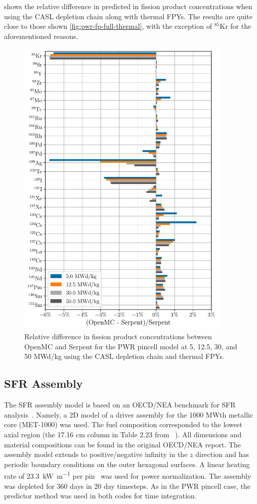 \documentclass[3p,authoryear]{elsarticle}
\begin{document}
 shows the relative difference in predicted in
fission product concentrations when using the CASL depletion chain along with
thermal FPYs. The results are quite close to those shown
\cref{fig:pwr-fp-full-thermal}, with the exception of $^{85}$Kr for the
aforementioned reasons.
\begin{figure}[H]
  \centering
  \includegraphics[width=4in]{figures/pwr_fp_casl_thermal.pdf}
  \caption{Relative difference in fission product concentrations between OpenMC
  and Serpent for the PWR pincell model at 5, 12.5, 30, and 50 MWd/kg using the
  CASL depletion chain and thermal FPYs.}
  \label{fig:pwr-fp-casl-thermal}
\end{figure}

\subsection{SFR Assembly}

The SFR assembly model is based on an OECD/NEA benchmark for SFR
analysis~\citep{nsc2015}. Namely, a 2D model of a driver assembly for the 1000
MWth metallic core (MET-1000) was used. The fuel composition corresponded to the
lowest axial region (the 17.16 cm column in Table 2.23 from ~\citep{nsc2015}).
All dimensions and material compositions can be found in the original OECD/NEA
report. The assembly model extends to positive/negative infinity in the $z$
direction and has periodic boundary conditions on the outer hexagonal surfaces.
A linear heating rate of \SI{23.3}{\kilo\watt\per\meter} per
pin~\citep{cahalan2007anl} was used for power normalization. The assembly was
depleted for 360 days in 20 day timesteps. As in the PWR pincell case, the
predictor method was used in both codes for time integration.
\end{document}
